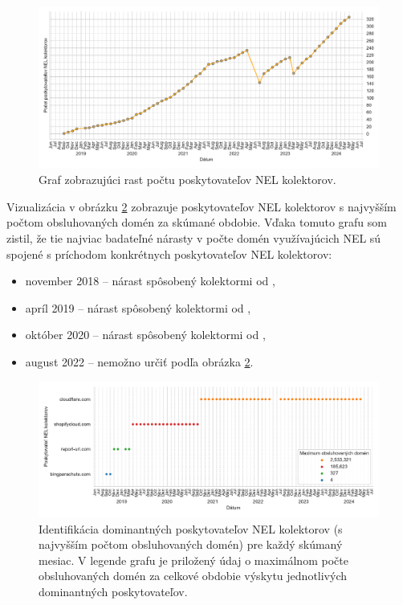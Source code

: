 \begin{figure}[!htb]
\begin{center}
 \includegraphics[scale=0.57]{obrazky-figures/httparchive_nel_collector_provider_count.pdf}
 \caption{Graf zobrazujúci rast počtu poskytovateľov NEL kolektorov.}
 \label{fig:httparchive-nel-collector-provider-count}
\end{center}
\end{figure}

Vizualizácia v obrázku \ref{fig:httparchive-nel-collector-provider-top-1-over-time} zobrazuje poskytovateľov NEL kolektorov s najvyšším počtom obsluhovaných domén za skúmané obdobie. 
Vďaka tomuto grafu som zistil, že tie najviac badateľné nárasty v počte domén využívajúcich NEL sú spojené s príchodom konkrétnych poskytovateľov NEL kolektorov:
\begin{itemize}
\item november 2018 -- nárast spôsobený kolektormi od ,
\item apríl 2019 -- nárast spôsobený kolektormi od ,
\item október 2020 -- nárast spôsobený kolektormi od ,
\item august 2022 -- nemožno určiť podľa obrázka \ref{fig:httparchive-nel-collector-provider-top-1-over-time}.
\end{itemize}

\begin{figure}[!htb]
\begin{center}
 \includegraphics[scale=0.598]{obrazky-figures/httparchive_nel_collector_provider_top_1_over_time.pdf}
 \caption{Identifikácia dominantných poskytovateľov NEL kolektorov (s najvyšším počtom obsluhovaných domén) pre každý skúmaný mesiac. V legende grafu je priložený údaj o maximálnom počte obsluhovaných domén za celkové obdobie výskytu jednotlivých dominantných poskytovateľov.}
 \label{fig:httparchive-nel-collector-provider-top-1-over-time}
\end{center}
\end{figure}

